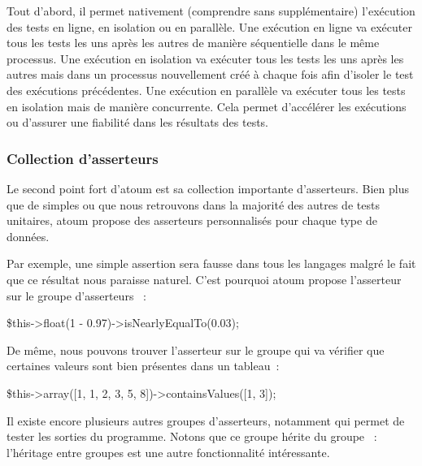 Tout d'abord, il permet nativement (comprendre sans 
supplémentaire) l'exécution des tests en ligne, en isolation ou en parallèle.
Une exécution en ligne va exécuter tous les tests les uns après les autres de
manière séquentielle dans le même processus. Une exécution en isolation va
exécuter tous les tests les uns après les autres mais dans un processus
nouvellement créé à chaque fois afin d'isoler le test des exécutions
précédentes. Une exécution en parallèle va exécuter tous les tests en isolation
mais de manière concurrente. Cela permet d'accélérer les exécutions ou d'assurer
une fiabilité dans les résultats des tests.

\subsubsection{Collection d'asserteurs}

Le second point fort d'atoum est sa collection importante d'asserteurs. Bien
plus que de simples  ou  que nous retrouvons
dans la majorité des autres  de tests unitaires, atoum
propose des asserteurs personnalisés pour chaque type de données.

\begin{example}

Par exemple, une simple assertion  sera fausse dans tous
les langages malgré le fait que ce résultat nous paraisse naturel. C'est
pourquoi atoum propose l'asserteur  sur le groupe
d'asserteurs ~:
%
\begin{pre}
\$this->float(1 - 0.97)->isNearlyEqualTo(0.03);
\end{pre}
%
De même, nous pouvons trouver l'asserteur  sur le groupe
 qui va vérifier que certaines valeurs sont bien présentes dans un
tableau~:
%
\begin{pre}
\$this->array([1, 1, 2, 3, 5, 8])->containsValues([1, 3]);
\end{pre}
%
Il existe encore plusieurs autres groupes d'asserteurs, notamment 
qui permet de tester les sorties du programme. Notons que ce groupe hérite du
groupe ~: l'héritage entre groupes est une autre fonctionnalité
intéressante.

\end{example}

\subsubsection{}

